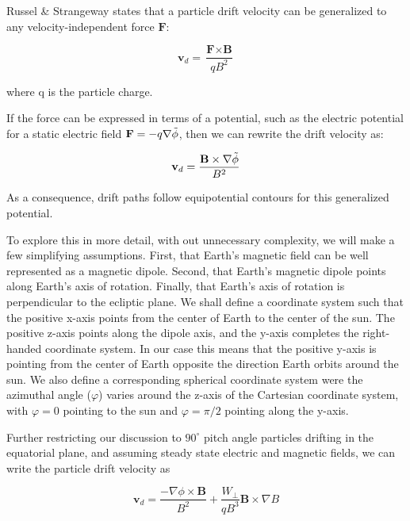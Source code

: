 \documentclass[utf8]{report}
\begin{document}
Russel \& Strangeway states that a particle drift velocity can be generalized to any velocity-independent force $\textbf{F}$:

\begin{equation}
    \textbf{v}_{d} = \frac{\textbf{F}\times\textbf{B}}{qB^{2}}
    \label{eq:PS.1}
\end{equation}

where q is the particle charge. 

If the force can be expressed in terms of a potential, such as the electric potential for a static electric field $\textbf{F} = -q\nabla\Tilde{\phi}$, then we can rewrite the drift velocity as: 

\begin{equation}
    \textbf{v}_{d} = \frac{\textbf{B}\times\nabla\Tilde{\phi}}{B^{2}}
    \label{eq:PS.2}
\end{equation}

As a consequence, drift paths follow equipotential contours for this generalized potential. 

To explore this in more detail, with out unnecessary complexity, we will make a few simplifying assumptions. First, that Earth's magnetic field can be well represented as a magnetic dipole. Second, that Earth's magnetic dipole points along Earth's axis of rotation. Finally, that Earth's axis of rotation is perpendicular to the ecliptic plane. We shall define a coordinate system such that the positive x-axis points from the center of Earth to the center of the sun. The positive z-axis points along the dipole axis, and the y-axis completes the right-handed coordinate system. In our case this means that the positive y-axis is pointing from the center of Earth opposite the direction Earth orbits around the sun. We also define a corresponding spherical coordinate system were the azimuthal angle ($\varphi$) varies around the z-axis of the Cartesian coordinate system, with $\varphi = 0$ pointing to the sun and $\varphi = \pi / 2$ pointing along the y-axis. 

Further restricting our discussion to $90^{\circ}$ pitch angle particles drifting in the equatorial plane, and assuming steady state electric and magnetic fields, we can write the particle drift velocity as 

\begin{equation}
    \textbf{v}_{d} = \frac{-\nabla\phi \times \textbf{B}}{B^{2}} + \frac{W_{\perp}}{qB^{3}}\textbf{B} \times \nabla B
    \label{eq:PS.3}
\end{equation}
\end{document}
